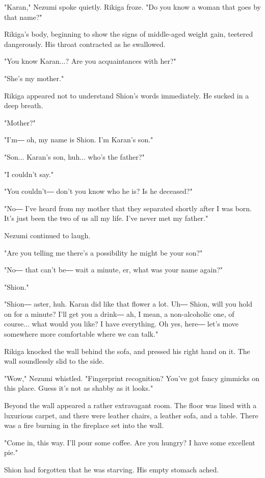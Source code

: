 "Karan," Nezumi spoke quietly. Rikiga froze. "Do you know a woman that
goes by that name?"

Rikiga's body, beginning to show the signs of middle-aged weight gain,
teetered dangerously. His throat contracted as he swallowed.

"You know Karan...? Are you acquaintances with her?"

"She's my mother."

Rikiga appeared not to understand Shion's words immediately. He sucked
in a deep breath.

"Mother?"

"I'm― oh, my name is Shion. I'm Karan's son."

"Son... Karan's son, huh... who's the father?"

"I couldn't say."

"You couldn't― don't you know who he is? Is he deceased?"

"No― I've heard from my mother that they separated shortly after I was
born. It's just been the two of us all my life. I've never met my
father."

Nezumi continued to laugh.

"Are you telling me there's a possibility he might be your son?"

"No― that can't be― wait a minute, er, what was your name again?"

"Shion."

"Shion― aster, huh. Karan did like that flower a lot. Uh― Shion, will
you hold on for a minute? I'll get you a drink― ah, I mean, a
non-alcoholic one, of course... what would you like? I have everything.
Oh yes, here― let's move somewhere more comfortable where we can talk."

Rikiga knocked the wall behind the sofa, and pressed his right hand on
it. The wall soundlessly slid to the side.

"Wow," Nezumi whistled. "Fingerprint recognition? You've got fancy
gimmicks on this place. Guess it's not as shabby as it looks."

Beyond the wall appeared a rather extravagant room. The floor was lined
with a luxurious carpet, and there were leather chairs, a leather sofa,
and a table. There was a fire burning in the fireplace set into the
wall.

"Come in, this way. I'll pour some coffee. Are you hungry? I have some
excellent pie."

Shion had forgotten that he was starving. His empty stomach ached.

